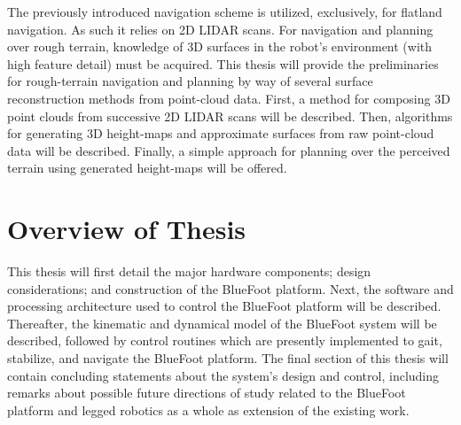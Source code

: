 		The previously introduced navigation scheme is utilized, exclusively, for flatland navigation. As such it relies on 2D LIDAR scans. For navigation and planning over rough terrain, knowledge of 3D surfaces in the robot’s environment (with high feature detail) must be acquired. This thesis will provide the preliminaries for rough-terrain navigation and planning by way of several surface reconstruction methods from point-cloud data. First, a method for composing 3D point clouds from successive 2D LIDAR scans will be described. Then, algorithms for generating 3D height-maps and approximate surfaces from raw point-cloud data will be described. Finally, a simple approach for planning over the perceived terrain using generated height-maps will be offered.


		\section{Overview of Thesis}

		This thesis will first detail the major hardware components; design considerations; and construction of the BlueFoot platform. Next, the software and processing architecture used to control the BlueFoot platform will be described. Thereafter, the kinematic and dynamical model of the BlueFoot system will be described, followed by control routines which are presently implemented to gait, stabilize, and navigate the BlueFoot platform. The final section of this thesis will contain concluding statements about the system's design and control, including remarks about possible future directions of study related to the BlueFoot platform and legged robotics as a whole as extension of the existing work.
